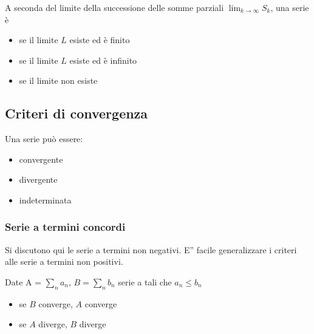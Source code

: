 \documentclass[letterpaper,10pt,italian]{jupyterBook}
\begin{document}
\sphinxAtStartPar
{}
A seconda del limite della successione delle somme parziali \(\lim_{k \rightarrow \infty} S_k\), una serie è
\begin{itemize}
\item {} 
\sphinxAtStartPar
{} se il limite \(L\) esiste ed è finito

\item {} 
\sphinxAtStartPar
{} se il limite \(L\) esiste ed è infinito

\item {} 
\sphinxAtStartPar
{} se il limite non esiste

\end{itemize}


\subsection{Criteri di convergenza}
\label{\detokenize{ch/series/series-numerical-real:criteri-di-convergenza}}
\sphinxAtStartPar
Una serie può essere:
\begin{itemize}
\item {} 
\sphinxAtStartPar
convergente

\item {} 
\sphinxAtStartPar
divergente

\item {} 
\sphinxAtStartPar
indeterminata

\end{itemize}


\subsubsection{Serie a termini concordi}
\label{\detokenize{ch/series/series-numerical-real:serie-a-termini-concordi}}
\sphinxAtStartPar
Si discutono qui le serie a termini non negativi. E” facile generalizzare i criteri alle serie a termini non positivi.

\sphinxAtStartPar
{} Date A = \(\sum_n a_n\), \(B =\sum_n b_n\) serie a  tali che \(a_n \le b_n\)
\begin{itemize}
\item {} 
\sphinxAtStartPar
se \(B\) converge, \(A\) converge

\item {} 
\sphinxAtStartPar
se \(A\)  diverge, \(B\)  diverge

\end{itemize}
\end{document}
